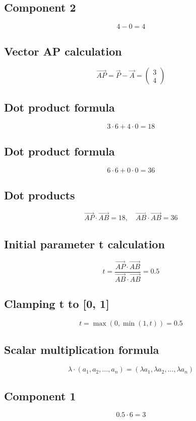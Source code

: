 \documentclass{article}
\begin{document}
\subsection*{ \vspace{1em} Component 2}
\[
4 - 0 = 4
\]
\subsection*{ \vspace{1em} Vector AP calculation}
\[
\vec{AP} = \vec{P} - \vec{A} = \begin{pmatrix}3 \\ 4\end{pmatrix}
\]
\subsection*{ \vspace{1em} Dot product formula}
\[
3 \cdot 6 + 4 \cdot 0 = 18
\]
\subsection*{ \vspace{1em} Dot product formula}
\[
6 \cdot 6 + 0 \cdot 0 = 36
\]
\subsection*{ \vspace{1em} Dot products}
\[
\vec{AP} \cdot \vec{AB} = 18, \quad \vec{AB} \cdot \vec{AB} = 36
\]
\subsection*{ \vspace{1em} Initial parameter t calculation}
\[
t = \frac{\vec{AP} \cdot \vec{AB}}{\vec{AB} \cdot \vec{AB}} = 0.5
\]
\subsection*{ \vspace{1em} Clamping t to [0, 1]}
\[
t = \max(0, \min(1, t)) = 0.5
\]
\subsection*{ \vspace{1em} Scalar multiplication formula}
\[
\lambda \cdot (a_1, a_2, \dots, a_n) = (\lambda a_1, \lambda a_2, \dots, \lambda a_n)
\]
\subsection*{ \vspace{1em} Component 1}
\[
0.5 \cdot 6 = 3
\]
\end{document}
